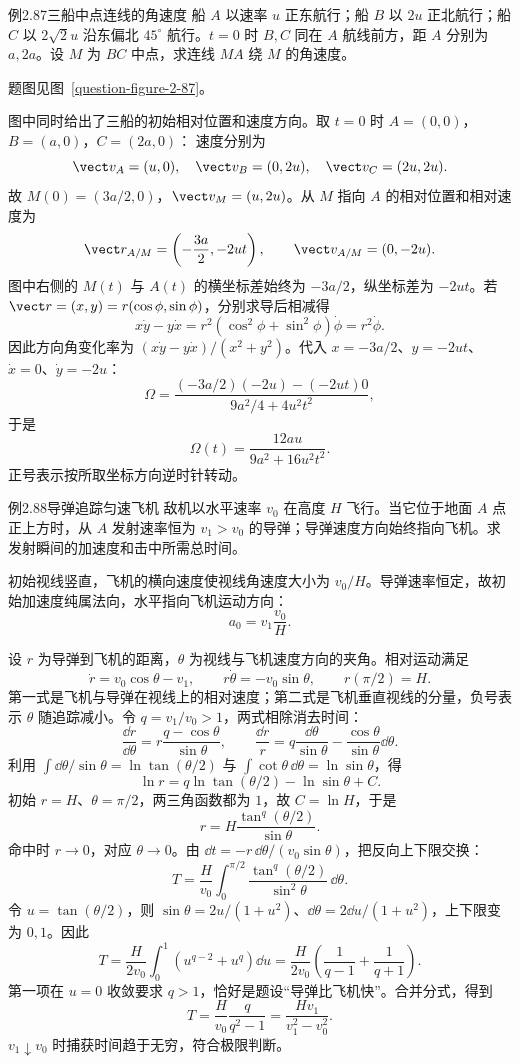 \begin{origexamplebox}{例2.87\quad 三船中点连线的角速度}
船 $A$ 以速率 $u$ 正东航行；船 $B$ 以 $2u$ 正北航行；船 $C$ 以 $2\sqrt2u$ 沿东偏北 $45^\circ$ 航行。$t=0$ 时 $B,C$ 同在 $A$ 航线前方，距 $A$ 分别为 $a,2a$。设 $M$ 为 $BC$ 中点，求连线 $MA$ 绕 $M$ 的角速度。
\par 题图见图~\ref{question-figure-2-87}。
\KQuestionDJ
\end{origexamplebox}
\begin{xesolution}
图中同时给出了三船的初始相对位置和速度方向。取 $t=0$ 时 $A=(0,0)$，$B=(a,0)$，$C=(2a,0)$：
\ThreeBoatsDiagram
速度分别为
\[
\vect v_A=(u,0),\quad\vect v_B=(0,2u),\quad\vect v_C=(2u,2u).
\]
故 $M(0)=(3a/2,0)$，$\vect v_M=(u,2u)$。从 $M$ 指向 $A$ 的相对位置和相对速度为
\[
\vect r_{A/M}=\left(-\frac{3a}{2},-2ut\right),\qquad
\vect v_{A/M}=(0,-2u).
\]
图中右侧的 $M(t)$ 与 $A(t)$ 的横坐标差始终为 $-3a/2$，纵坐标差为 $-2ut$。若 $\vect r=(x,y)=r(\cos\phi,\sin\phi)$，分别求导后相减得
\[
x\dot y-y\dot x
=r^2(\cos^2\phi+\sin^2\phi)\dot\phi=r^2\dot\phi.
\]
因此方向角变化率为 $(x\dot y-y\dot x)/(x^2+y^2)$。代入 $x=-3a/2$、$y=-2ut$、$\dot x=0$、$\dot y=-2u$：
\[
\Omega=\frac{(-3a/2)(-2u)-(-2ut)0}{9a^2/4+4u^2t^2},
\]
于是
\[
\boxed{\Omega(t)=\frac{12au}{9a^2+16u^2t^2}}.
\]
正号表示按所取坐标方向逆时针转动。
\end{xesolution}

\begin{origexamplebox}{例2.88\quad 导弹追踪匀速飞机}
敌机以水平速率 $v_0$ 在高度 $H$ 飞行。当它位于地面 $A$ 点正上方时，从 $A$ 发射速率恒为 $v_1>v_0$ 的导弹；导弹速度方向始终指向飞机。求发射瞬间的加速度和击中所需总时间。
\end{origexamplebox}
\begin{xesolution}
初始视线竖直，飞机的横向速度使视线角速度大小为 $v_0/H$。导弹速率恒定，故初始加速度纯属法向，水平指向飞机运动方向：
\PursuitDiagram
\[
\boxed{a_0=v_1\frac{v_0}{H}}.
\]

设 $r$ 为导弹到飞机的距离，$\theta$ 为视线与飞机速度方向的夹角。相对运动满足
\[
\dot r=v_0\cos\theta-v_1,
\qquad r\dot\theta=-v_0\sin\theta,
\qquad r(\pi/2)=H.
\]
第一式是飞机与导弹在视线上的相对速度；第二式是飞机垂直视线的分量，负号表示 $\theta$ 随追踪减小。令 $q=v_1/v_0>1$，两式相除消去时间：
\[
\frac{\dd r}{\dd\theta}
=r\frac{q-\cos\theta}{\sin\theta},\qquad
\frac{\dd r}{r}=q\frac{\dd\theta}{\sin\theta}
-\frac{\cos\theta}{\sin\theta}\dd\theta.
\]
利用 $\int\dd\theta/\sin\theta=\ln\tan(\theta/2)$ 与 $\int\cot\theta\,\dd\theta=\ln\sin\theta$，得
\[
\ln r=q\ln\tan(\theta/2)-\ln\sin\theta+C.
\]
初始 $r=H$、$\theta=\pi/2$，两三角函数都为 $1$，故 $C=\ln H$，于是
\[
r=H\frac{\tan^q(\theta/2)}{\sin\theta}.
\]
命中时 $r\to0$，对应 $\theta\to0$。由 $\dd t=-r\,\dd\theta/(v_0\sin\theta)$，把反向上下限交换：
\[
T=\frac H{v_0}\int_0^{\pi/2}
\frac{\tan^q(\theta/2)}{\sin^2\theta}\,\dd\theta.
\]
令 $u=\tan(\theta/2)$，则 $\sin\theta=2u/(1+u^2)$、$\dd\theta=2\dd u/(1+u^2)$，上下限变为 $0,1$。因此
\[
T=\frac H{2v_0}\int_0^1(u^{q-2}+u^q)\dd u
=\frac H{2v_0}\left(\frac1{q-1}+\frac1{q+1}\right).
\]
第一项在 $u=0$ 收敛要求 $q>1$，恰好是题设“导弹比飞机快”。合并分式，得到
\[
T=\frac{H}{v_0}\frac{q}{q^2-1}
=\boxed{\frac{Hv_1}{v_1^2-v_0^2}}.
\]
$v_1\downarrow v_0$ 时捕获时间趋于无穷，符合极限判断。
\end{xesolution}
